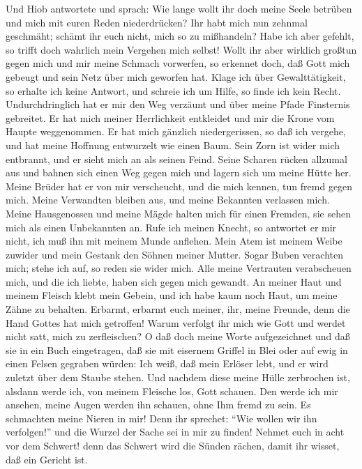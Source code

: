  Und Hiob antwortete und sprach:  Wie lange
wollt ihr doch meine Seele betrüben und mich mit euren Reden
niederdrücken?  Ihr habt mich nun zehnmal geschmäht;
schämt ihr euch nicht, mich so zu mißhandeln?  Habe ich
aber gefehlt, so trifft doch wahrlich mein Vergehen mich selbst!
 Wollt ihr aber wirklich großtun gegen mich und mir meine
Schmach vorwerfen,  so erkennet doch, daß Gott mich
gebeugt und sein Netz über mich geworfen hat.  Klage ich
über Gewalttätigkeit, so erhalte ich keine Antwort, und schreie ich um
Hilfe, so finde ich kein Recht.  Undurchdringlich hat er
mir den Weg verzäunt und über meine Pfade Finsternis gebreitet.
 Er hat mich meiner Herrlichkeit entkleidet und mir die
Krone vom Haupte weggenommen.  Er hat mich gänzlich
niedergerissen, so daß ich vergehe, und hat meine Hoffnung entwurzelt
wie einen Baum.  Sein Zorn ist wider mich entbrannt, und
er sieht mich an als seinen Feind.  Seine Scharen rücken
allzumal aus und bahnen sich einen Weg gegen mich und lagern sich um
meine Hütte her.  Meine Brüder hat er von mir
verscheucht, und die mich kennen, tun fremd gegen mich. 
Meine Verwandten bleiben aus, und meine Bekannten verlassen mich.
 Meine Hausgenossen und meine Mägde halten mich für einen
Fremden, sie sehen mich als einen Unbekannten an.  Rufe
ich meinen Knecht, so antwortet er mir nicht, ich muß ihn mit meinem
Munde anflehen.  Mein Atem ist meinem Weibe zuwider und
mein Gestank den Söhnen meiner Mutter.  Sogar Buben
verachten mich; stehe ich auf, so reden sie wider mich. 
Alle meine Vertrauten verabscheuen mich, und die ich liebte, haben sich
gegen mich gewandt.  An meiner Haut und meinem Fleisch
klebt mein Gebein, und ich habe kaum noch Haut, um meine Zähne zu
behalten.  Erbarmt, erbarmt euch meiner, ihr, meine
Freunde, denn die Hand Gottes hat mich getroffen!  Warum
verfolgt ihr mich wie Gott und werdet nicht satt, mich zu zerfleischen?
 O daß doch meine Worte aufgezeichnet und daß sie in ein
Buch eingetragen,  daß sie mit eisernem Griffel in Blei
oder auf ewig in einen Felsen gegraben würden:  Ich weiß,
daß mein Erlöser lebt, und er wird zuletzt über dem Staube stehen.
 Und nachdem diese meine Hülle zerbrochen ist, alsdann
werde ich, von meinem Fleische los, Gott schauen.  Den
werde ich mir ansehen, meine Augen werden ihn schauen, ohne Ihm fremd zu
sein. Es schmachten meine Nieren in mir!  Denn ihr
sprechet: ``Wie wollen wir ihn verfolgen!'' und die Wurzel der Sache sei
in mir zu finden!  Nehmet euch in acht vor dem Schwert!
denn das Schwert wird die Sünden rächen, damit ihr wisset, daß ein
Gericht ist.

